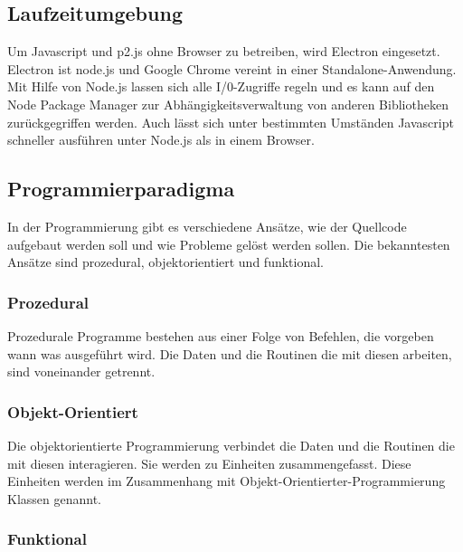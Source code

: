     \subsection{Laufzeitumgebung}


      Um Javascript und p2.js ohne Browser zu betreiben, wird Electron eingesetzt.
      Electron ist node.js und Google Chrome vereint in einer Standalone-Anwendung.
      Mit Hilfe von Node.js lassen sich alle I/0-Zugriffe regeln und es kann auf den
      Node Package Manager zur Abhängigkeitsverwaltung von anderen Bibliotheken zurückgegriffen werden.
      Auch lässt sich unter bestimmten Umständen Javascript schneller ausführen unter Node.js als in einem Browser.

    \subsection{Programmierparadigma\label{sub:TechnologyParadigma}}

      In der Programmierung gibt es verschiedene Ansätze,
      wie der Quellcode aufgebaut werden soll und wie Probleme gelöst werden sollen.
      Die bekanntesten Ansätze sind prozedural, objektorientiert und funktional.

      \subsubsection{Prozedural\label{subsub:TechnologyParadigmaProzedural}}

        Prozedurale Programme bestehen aus einer Folge von Befehlen,
        die vorgeben wann was ausgeführt wird.
        Die Daten und die Routinen die mit diesen arbeiten, sind voneinander getrennt.

      \subsubsection{Objekt-Orientiert\label{subsub:TechnologyParadigmaObjectOriented}}

        Die objektorientierte Programmierung verbindet die Daten und
        die Routinen die mit diesen interagieren. Sie werden zu Einheiten zusammengefasst.
        Diese Einheiten werden im Zusammenhang mit Objekt-Orientierter-Programmierung Klassen genannt.

      \subsubsection{Funktional\label{subsub:TechnologyParadigmaFunctional}}

